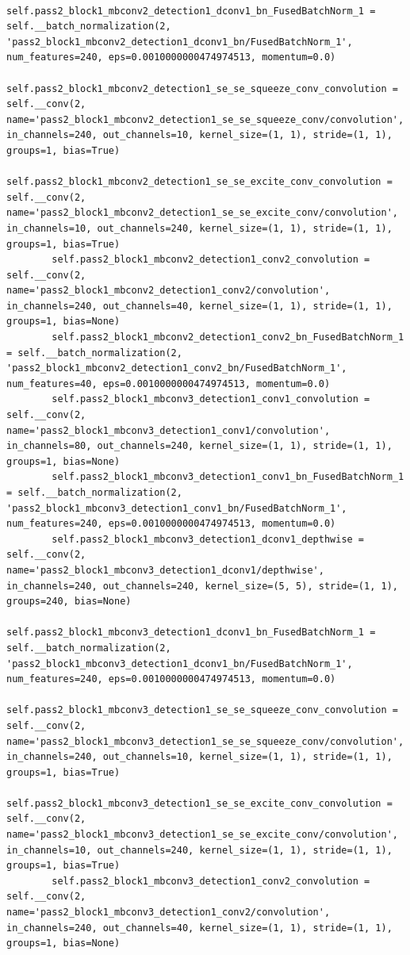 \documentclass{fisatprojectfinal}
\begin{document}
\begin{appendices}
\begin{lstlisting}
        self.pass2_block1_mbconv2_detection1_dconv1_bn_FusedBatchNorm_1 = self.__batch_normalization(2, 'pass2_block1_mbconv2_detection1_dconv1_bn/FusedBatchNorm_1', num_features=240, eps=0.0010000000474974513, momentum=0.0)
        self.pass2_block1_mbconv2_detection1_se_se_squeeze_conv_convolution = self.__conv(2, name='pass2_block1_mbconv2_detection1_se_se_squeeze_conv/convolution', in_channels=240, out_channels=10, kernel_size=(1, 1), stride=(1, 1), groups=1, bias=True)
        self.pass2_block1_mbconv2_detection1_se_se_excite_conv_convolution = self.__conv(2, name='pass2_block1_mbconv2_detection1_se_se_excite_conv/convolution', in_channels=10, out_channels=240, kernel_size=(1, 1), stride=(1, 1), groups=1, bias=True)
        self.pass2_block1_mbconv2_detection1_conv2_convolution = self.__conv(2, name='pass2_block1_mbconv2_detection1_conv2/convolution', in_channels=240, out_channels=40, kernel_size=(1, 1), stride=(1, 1), groups=1, bias=None)
        self.pass2_block1_mbconv2_detection1_conv2_bn_FusedBatchNorm_1 = self.__batch_normalization(2, 'pass2_block1_mbconv2_detection1_conv2_bn/FusedBatchNorm_1', num_features=40, eps=0.0010000000474974513, momentum=0.0)
        self.pass2_block1_mbconv3_detection1_conv1_convolution = self.__conv(2, name='pass2_block1_mbconv3_detection1_conv1/convolution', in_channels=80, out_channels=240, kernel_size=(1, 1), stride=(1, 1), groups=1, bias=None)
        self.pass2_block1_mbconv3_detection1_conv1_bn_FusedBatchNorm_1 = self.__batch_normalization(2, 'pass2_block1_mbconv3_detection1_conv1_bn/FusedBatchNorm_1', num_features=240, eps=0.0010000000474974513, momentum=0.0)
        self.pass2_block1_mbconv3_detection1_dconv1_depthwise = self.__conv(2, name='pass2_block1_mbconv3_detection1_dconv1/depthwise', in_channels=240, out_channels=240, kernel_size=(5, 5), stride=(1, 1), groups=240, bias=None)
        self.pass2_block1_mbconv3_detection1_dconv1_bn_FusedBatchNorm_1 = self.__batch_normalization(2, 'pass2_block1_mbconv3_detection1_dconv1_bn/FusedBatchNorm_1', num_features=240, eps=0.0010000000474974513, momentum=0.0)
        self.pass2_block1_mbconv3_detection1_se_se_squeeze_conv_convolution = self.__conv(2, name='pass2_block1_mbconv3_detection1_se_se_squeeze_conv/convolution', in_channels=240, out_channels=10, kernel_size=(1, 1), stride=(1, 1), groups=1, bias=True)
        self.pass2_block1_mbconv3_detection1_se_se_excite_conv_convolution = self.__conv(2, name='pass2_block1_mbconv3_detection1_se_se_excite_conv/convolution', in_channels=10, out_channels=240, kernel_size=(1, 1), stride=(1, 1), groups=1, bias=True)
        self.pass2_block1_mbconv3_detection1_conv2_convolution = self.__conv(2, name='pass2_block1_mbconv3_detection1_conv2/convolution', in_channels=240, out_channels=40, kernel_size=(1, 1), stride=(1, 1), groups=1, bias=None)

\end{lstlisting}
\end{appendices}
\end{document}
